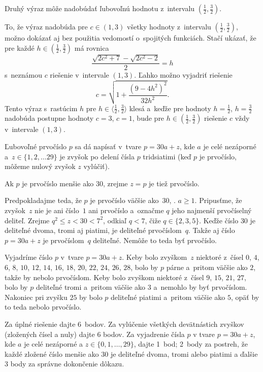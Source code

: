 {\zaver
Druhý výraz môže nadobúdať ľubovoľnú hodnotu z~intervalu $(\frac12,\frac32)$.

\poznamka
To, že výraz  nadobúda pre $c\in(1,3)$ všetky hodnoty z~intervalu $(\frac12,\frac32)$, možno dokázať aj bez použitia vedomostí o~spojitých funkciách. Stačí ukázať, že pre každé $h\in(\frac12,\frac32)$ má rovnica
$$
\frac{\sqrt{2c^2+7}-\sqrt{2c^2-2}}2=h
$$
s~neznámou $c$ riešenie v~intervale $(1,3)$. Ľahko možno vyjadriť riešenie
$$
c=\sqrt{1+\frac{(9-4h^2)^2}{32h^2}}.
$$
Tento výraz s~rastúcim $h$ pre $h\in\langle\frac12,\frac32\rangle$ klesá a~keďže pre hodnoty $h=\frac12$, $h=\frac32$ nadobúda postupne hodnoty $c=3$, $c=1$, bude pre $h\in(\frac12,\frac32)$ riešenie $c$ vždy v~intervale $(1,3)$.
}

{%
Ľubovoľné prvočíslo $p$ sa dá napísať v~tvare $p=30a+z$,
kde $a$ je celé nezáporné a~$z\in\{1,2,\dots29\}$ je zvyšok po delení čísla $p$ tridsiatimi (keď $p$ je prvočíslo, môžeme nulový zvyšok $z$ vylúčiť).

Ak $p$ je prvočíslo menšie ako $30$, zrejme $z=p$ je tiež prvočíslo.

Predpokladajme teda, že $p$ je prvočíslo väčšie ako~$30$, \tj. $a\ge 1$.
Pripusťme, že zvyšok~$z$ nie je ani číslo~$1$ ani prvočíslo a~označme $q$ jeho najmenší prvočíselný deliteľ.
Zrejme $q^2\le z<30<7^2$, odkiaľ $q<7$, čiže $q\in \{2,3,5\}$.
Keďže číslo $30$ je deliteľné dvoma, tromi aj piatimi, je deliteľné prvočíslom~$q$.
Takže aj číslo $p=30a+z$ je prvočíslom~$q$ deliteľné. Nemôže to teda
byť prvočíslo.

\ineriesenie
Vyjadríme číslo $p$ v~tvare $p=30a+z$. Keby bolo zvyškom~$z$ niektoré z~čísel $0$, $4$, $6$, $8$, $10$, $12$, $14$, $16$, $18$, $20$, $22$, $24$, $26$, $28$, bolo by $p$ párne a~pritom väčšie ako $2$, takže by nebolo prvočíslom. Keby bolo zvyškom niektoré z~čísel $9$, $15$, $21$, $27$, bolo by $p$ deliteľné tromi a~pritom väčšie ako $3$ a~nemohlo by byť prvočíslom. Nakoniec pri zvyšku $25$ by bolo $p$ deliteľné piatimi a~pritom väčšie ako $5$, opäť by to teda nebolo prvočíslo.

\nobreak\medskip\petit\noindent
Za úplné riešenie dajte 6~bodov.
Za vylúčenie všetkých devätnástich zvyškov (zložených čísel a nuly) dajte 6 bodov.
Za vyjadrenie čísla $p$ v tvare $p=30a+z$, kde $a$ je celé nezáporné a $z\in \{0,1,\dots,29\}$, dajte 1~bod; 2~body za postreh, že každé zložené číslo menšie ako 30 je deliteľné dvoma, tromi alebo piatimi a ďalšie 3 body za správne dokončenie dôkazu.
\endpetit
\bigbreak}

